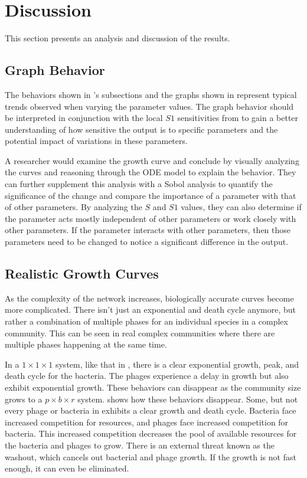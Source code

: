 \chapter{Discussion}
\label{Discussion}
This section presents an analysis and discussion of the results. 

\section{Graph Behavior}
The behaviors shown in 's subsections and the graphs shown in  represent typical trends observed when varying the parameter values. 
The graph behavior should be interpreted in conjunction with the local $S1$ sensitivities from  to gain a better understanding of how sensitive the output is to specific parameters and the potential impact of variations in these parameters.

A researcher would examine the growth curve and conclude by visually analyzing the curves and reasoning through the ODE model to explain the behavior. 
They can further supplement this analysis with a Sobol analysis to quantify the significance of the change and compare the importance of a parameter with that of other parameters. 
By analyzing the $S$ and $S1$ values, they can also determine if the parameter acts mostly independent of other parameters or work closely with other parameters. 
If the parameter interacts with other parameters, then those parameters need to be changed to notice a significant difference in the output. 

\section{Realistic Growth Curves}
As the complexity of the network increases, biologically accurate curves become more complicated. 
There isn't just an exponential and death cycle anymore, but rather a combination of multiple phases for an individual species in a complex community. 
This can be seen in real complex communities where there are multiple phases happening at the same time. 

In a $1\times 1\times 1$ system, like that in , there is a clear exponential growth, peak, and death cycle for the bacteria. 
The phages experience a delay in growth but also exhibit exponential growth. 
These behaviors can disappear as the community size grows to a $p\times b\times r$ system. 
 shows how these behaviors disappear. 
Some, but not every phage or bacteria in  exhibits a clear growth and death cycle. 
Bacteria face increased competition for resources, and phages face increased competition for bacteria. 
This increased competition decreases the pool of available resources for the bacteria and phages to grow. 
There is an external threat known as the washout, which cancels out bacterial and phage growth. If the growth is not fast enough, it can even be eliminated. 

